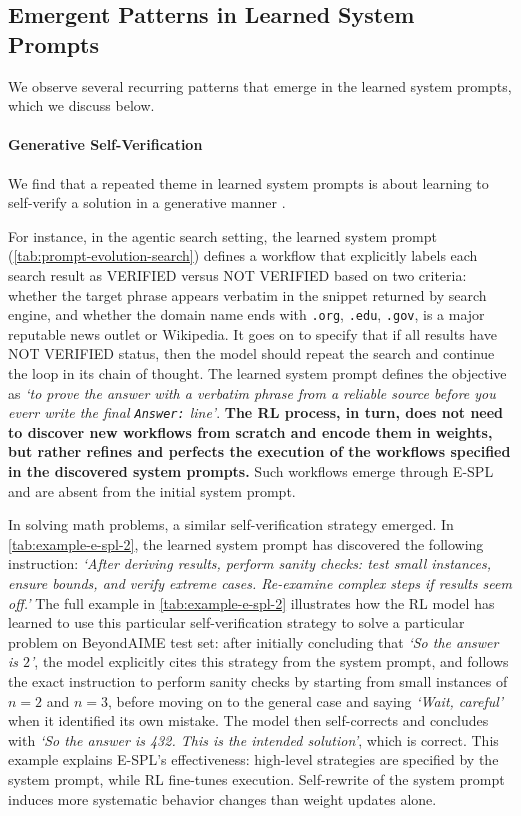 \documentclass{article}
\theoremstyle{plain}
\theoremstyle{definition}
\theoremstyle{remark}
\begin{document}
\vspace{-5pt}
\subsection{Emergent Patterns in Learned System Prompts}

We observe several recurring patterns that emerge in the learned system prompts, which we discuss below.

\vspace{-10pt}
\paragraph{Generative Self-Verification} We find that a repeated theme in learned system prompts is about learning to self-verify a solution in a generative manner \cite{gen-verifier}.

For instance, in the agentic search setting, the learned system prompt (\autoref{tab:prompt-evolution-search}) defines a workflow that explicitly labels each search result as VERIFIED versus NOT VERIFIED based on two criteria: whether the target phrase appears verbatim in the snippet returned by search engine, and whether the domain name ends with \texttt{.org}, \texttt{.edu}, \texttt{.gov}, is a major reputable news outlet or Wikipedia. It goes on to specify that if all results have NOT VERIFIED status, then the model should repeat the search and continue the loop in its chain of thought. The learned system prompt defines the objective as \emph{`to prove the answer with a verbatim phrase from a reliable source before you everr write the final \texttt{Answer:} line'}. \textbf{The RL process, in turn, does not need to discover new workflows from scratch and encode them in weights, but rather refines and perfects the execution of the workflows specified in the discovered system prompts.} Such workflows emerge through E-SPL and are absent from the initial system prompt.

In solving math problems, a similar self-verification strategy emerged. In \autoref{tab:example-e-spl-2}, the learned system prompt has discovered the following instruction: \emph{`After deriving results, perform sanity checks: test small instances, ensure bounds, and verify extreme cases. Re-examine complex steps if results seem off.'} The full example in \autoref{tab:example-e-spl-2} illustrates how the RL model has learned to use this particular self-verification strategy to solve a particular problem on BeyondAIME test set: after initially concluding that \emph{`So the answer is $2$'}, the model explicitly cites this strategy from the system prompt, and follows the exact instruction to perform sanity checks by starting from small instances of $n=2$ and $n=3$, before moving on to the general case and saying \emph{`Wait, careful'} when it identified its own mistake. The model then self-corrects and concludes with \emph{`So the answer is 432. This is the intended solution'}, which is correct. This example explains E-SPL's effectiveness: high-level strategies are specified by the system prompt, while RL fine-tunes execution. Self-rewrite of the system prompt induces more systematic behavior changes than weight updates alone.
\end{document}
